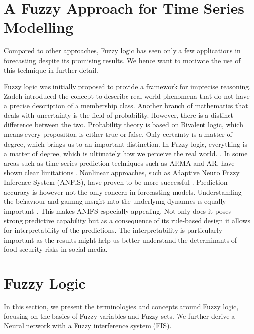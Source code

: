 \section{A Fuzzy Approach for Time Series Modelling}

Compared to other approaches, Fuzzy logic has seen only a few applications in forecasting despite its promising results. We hence want to motivate the use of this technique in further detail. 

Fuzzy logic was initially proposed to provide a framework for imprecise reasoning. Zadeh \cite{Zadeh65} introduced the concept to describe real world phenomena that do not have a precise description of a membership class. Another branch of mathematics that deals with uncertainty is the field of probability. However, there is a distinct difference between the two. Probability theory is based on Bivalent logic, which means every proposition is either true or false. Only certainty is a matter of degree, which brings us to an important distinction. In Fuzzy logic, everything is a matter of degree, which is ultimately how we perceive the real world.  \cite{Jang91}.  
In some areas such as time series prediction techniques such as ARMA and AR, have shown clear limitations \cite{box90}. Nonlinear approaches, such as Adaptive Neuro Fuzzy Inference System (ANFIS), have proven to be more successful \cite{chap04}. Prediction accuracy is however not the only concern in forecasting models. Understanding the behaviour and gaining insight into the underlying dynamics is equally important \cite{neil93}. This makes ANIFS especially appealing. Not only does it poses strong predictive capability but as a consequence of its rule-based design it allows for interpretability of the predictions. The interpretability is particularly important as the results might help us better understand the determinants of food security risks in social media. 

\section{Fuzzy Logic}


In this section, we present the terminologies and concepts around Fuzzy logic, focusing on the basics of Fuzzy variables and Fuzzy sets. We further derive a Neural network with a Fuzzy interference system (FIS). 

